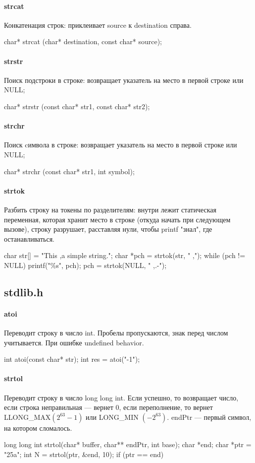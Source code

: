 \paragraph{strcat}
Конкатенация строк: приклеивает source к destination справа.
\begin{ccode}
char* strcat (char* destination, const char* source);
\end{ccode}
\paragraph{strstr}
Поиск подстроки в строке: возвращает указатель на место в первой строке или NULL;
\begin{ccode}
char* strstr (const char* str1, const char* str2);
\end{ccode}
\paragraph{strchr}
Поиск cимвола в строке: возвращает указатель на место в первой строке или NULL;
\begin{ccode}
char* strchr (const char* str1, int symbol);
\end{ccode}
\paragraph{strtok}
Разбить строку на токены по разделителям: внутри лежит статическая переменная, которая хранит место в строке (откуда начать при следующем вызове), строку разрушает, расставляя нули, чтобы printf "знал", где останавливаться.
\begin{ccode}
char str[] = "This ,a simple string.";
char *pch = strtok(str, " ,");
while (pch != NULL) {
    printf("\%s\n", pch);
    pch = strtok(NULL, " ,.-");
}
\end{ccode}
\subsection{stdlib.h}
\paragraph{atoi}
Переводит строку в число int. Пробелы пропускаются, знак перед числом учитывается. При ошибке undefined behavior.
\begin{ccode}
int atoi(const char* str);
int res = atoi("-1");
\end{ccode}
\paragraph{strtol}
Переводит строку в число long long int. Если успешно, то возвращает число, если строка неправильная --- вернет 0, если переполнение, то вернет LLONG\_MAX$(2^{63}-1)$ или LONG\_MIN $(-2^{63})$. endPtr --- первый символ, на котором сломалось.
\begin{ccode}
long long int strtol(char* buffer, char** endPtr, int base);
char *end; char *ptr = "25a";
int N = strtol(ptr, &end, 10);
if (ptr == end) {}
\end{ccode}
